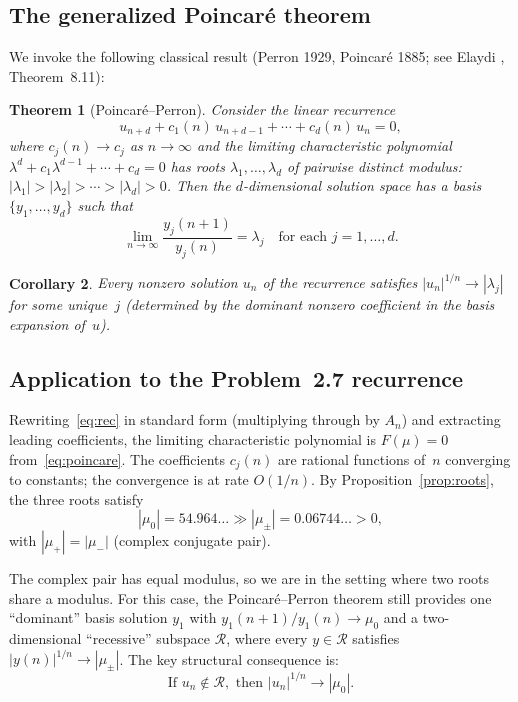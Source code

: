 \documentclass[11pt]{article}
\newtheorem{theorem}{Theorem}
\newtheorem{corollary}[theorem]{Corollary}
\theoremstyle{remark}
\begin{document}
\subsection{The generalized Poincar\'e theorem}

We invoke the following classical result
(Perron 1929, Poincar\'e 1885; see Elaydi \cite{Elaydi2005},
Theorem~8.11):

\begin{theorem}[Poincar\'e--Perron]\label{thm:PP}
Consider the linear recurrence
\[
u_{n+d} + c_1(n)\,u_{n+d-1} + \cdots + c_d(n)\,u_n = 0,
\]
where $c_j(n) \to c_j$ as $n \to \infty$ and the limiting
characteristic polynomial
$\lambda^d + c_1\lambda^{d-1} + \cdots + c_d = 0$
has roots $\lambda_1, \ldots, \lambda_d$ of pairwise distinct
modulus: $|\lambda_1| > |\lambda_2| > \cdots > |\lambda_d| > 0$.
Then the $d$-dimensional solution space has a basis
$\{y_1, \ldots, y_d\}$ such that
\[
\lim_{n \to \infty} \frac{y_j(n+1)}{y_j(n)} = \lambda_j
\quad \text{for each } j = 1, \ldots, d.
\]
\end{theorem}

\begin{corollary}\label{cor:growth}
Every nonzero solution $u_n$ of the recurrence satisfies
$|u_n|^{1/n} \to |\lambda_j|$ for some unique~$j$
(determined by the dominant nonzero coefficient in the basis
expansion of~$u$).
\end{corollary}

\subsection{Application to the Problem~2.7 recurrence}

Rewriting~\eqref{eq:rec} in standard form (multiplying through
by $A_n$) and extracting leading coefficients, the limiting
characteristic polynomial is $F(\mu) = 0$
from~\eqref{eq:poincare}. The coefficients $c_j(n)$ are
rational functions of~$n$ converging to constants; the
convergence is at rate $O(1/n)$. By
Proposition~\ref{prop:roots}, the three roots satisfy
\[
|\mu_0| = 54.964\ldots \gg |\mu_\pm| = 0.06744\ldots > 0,
\]
with $|\mu_+| = |\mu_-|$ (complex conjugate pair).

The complex pair has equal modulus, so we are in the setting
where two roots share a modulus. For this case, the
Poincar\'e--Perron theorem still provides one ``dominant''
basis solution $y_1$ with $y_1(n+1)/y_1(n) \to \mu_0$ and
a two-dimensional ``recessive'' subspace $\mathcal{R}$, where
every $y \in \mathcal{R}$ satisfies
$|y(n)|^{1/n} \to |\mu_\pm|$. The key structural consequence
is:
\begin{equation}\label{eq:decomp}
\text{If } u_n \notin \mathcal{R}, \text{ then }
|u_n|^{1/n} \to |\mu_0|.
\end{equation}
\end{document}
